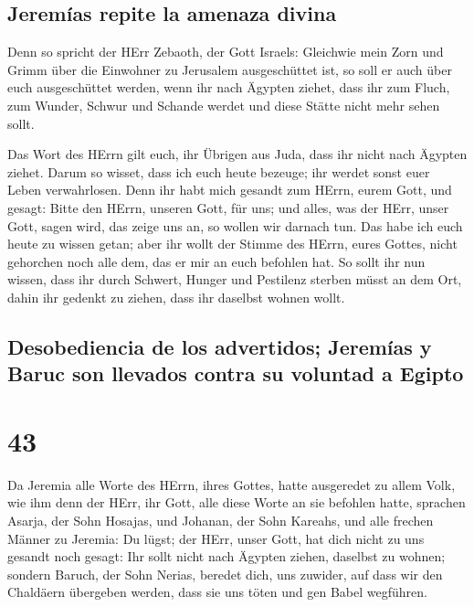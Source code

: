 \hypertarget{jeremuxedas-repite-la-amenaza-divina}{%
\subsection{Jeremías repite la amenaza
divina}\label{jeremuxedas-repite-la-amenaza-divina}}

 Denn so spricht der HErr Zebaoth, der Gott Israels:
Gleichwie mein Zorn und Grimm über die Einwohner zu Jerusalem
ausgeschüttet ist, so soll er auch über euch ausgeschüttet werden, wenn
ihr nach Ägypten ziehet, dass ihr zum Fluch, zum Wunder, Schwur und
Schande werdet und diese Stätte nicht mehr sehen sollt.

 Das Wort des HErrn gilt euch, ihr Übrigen aus Juda, dass
ihr nicht nach Ägypten ziehet. Darum so wisset, dass ich euch heute
bezeuge;  ihr werdet sonst euer Leben verwahrlosen. Denn
ihr habt mich gesandt zum HErrn, eurem Gott, und gesagt: Bitte den
HErrn, unseren Gott, für uns; und alles, was der HErr, unser Gott, sagen
wird, das zeige uns an, so wollen wir darnach tun.  Das
habe ich euch heute zu wissen getan; aber ihr wollt der Stimme des
HErrn, eures Gottes, nicht gehorchen noch alle dem, das er mir an euch
befohlen hat.  So sollt ihr nun wissen, dass ihr durch
Schwert, Hunger und Pestilenz sterben müsst an dem Ort, dahin ihr
gedenkt zu ziehen, dass ihr daselbst wohnen wollt.

\hypertarget{desobediencia-de-los-advertidos-jeremuxedas-y-baruc-son-llevados-contra-su-voluntad-a-egipto}{%
\subsection{Desobediencia de los advertidos; Jeremías y Baruc son
llevados contra su voluntad a
Egipto}\label{desobediencia-de-los-advertidos-jeremuxedas-y-baruc-son-llevados-contra-su-voluntad-a-egipto}}

\hypertarget{section-42}{%
\section{43}\label{section-42}}

 Da Jeremia alle Worte des HErrn, ihres Gottes, hatte
ausgeredet zu allem Volk, wie ihm denn der HErr, ihr Gott, alle diese
Worte an sie befohlen hatte,  sprachen Asarja, der Sohn
Hosajas, und Johanan, der Sohn Kareahs, und alle frechen Männer zu
Jeremia: Du lügst; der HErr, unser Gott, hat dich nicht zu uns gesandt
noch gesagt: Ihr sollt nicht nach Ägypten ziehen, daselbst zu wohnen;
 sondern Baruch, der Sohn Nerias, beredet dich, uns
zuwider, auf dass wir den Chaldäern übergeben werden, dass sie uns töten
und gen Babel wegführen.

